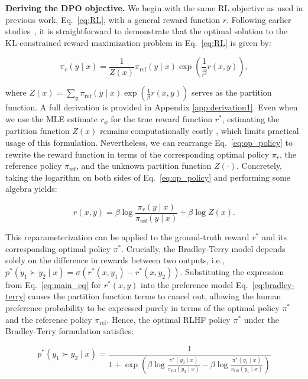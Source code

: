 \textbf{Deriving the DPO objective.} We begin with the same RL objective as used in previous work, Eq.~\ref{eq:RL}, with a general reward function $r$. Following earlier studies~\citep{peters2007reinforcement, peng2019advantage, korbak2022reinforcement, go2023aligning}, it is straightforward to demonstrate that the optimal solution to the KL-constrained reward maximization problem in Eq.~\ref{eq:RL} is given by:

\begin{equation}\label{eq:op_policy}
    \pi_r(y\mid x) = \frac{1}{Z(x)}\pi_\text{ref}(y\mid x)\exp\left(\frac{1}{\beta}r(x, y)\right),
\end{equation}

where $Z(x) = \sum_{y}\pi_\text{ref}(y\mid x)\exp\left(\frac{1}{\beta}r(x, y)\right)$ serves as the partition function. A full derivation is provided in Appendix \ref{app:derivation1}. Even when we use the MLE estimate $r_{\phi}$ for the true reward function $r^*$, estimating the partition function $Z(x)$ remains computationally costly \citep{korbak2022reinforcement, go2023aligning}, which limits practical usage of this formulation. Nevertheless, we can rearrange Eq.~\ref{eq:op_policy} to rewrite the reward function in terms of the corresponding optimal policy $\pi_r$, the reference policy $\pi_\text{ref}$, and the unknown partition function $Z(\cdot)$. Concretely, taking the logarithm on both sides of Eq.~\ref{eq:op_policy} and performing some algebra yields:

\begin{equation}\label{eq:main_eq}
    r(x,y) = \beta \log \frac{\pi_r(y\mid x)}{\pi_\text{ref}(y\mid x)} + \beta \log Z(x).
\end{equation}

This reparameterization can be applied to the ground-truth reward $r^*$ and its corresponding optimal policy $\pi^*$. Crucially, the Bradley-Terry model depends solely on the difference in rewards between two outputs, i.e., ${p^*(y_1 \succ y_2 \mid x) = \sigma(r^*(x, y_1) - r^*(x, y_2))}$. Substituting the expression from Eq.~\ref{eq:main_eq} for $r^*(x,y)$ into the preference model Eq.~\ref{eq:bradley-terry} causes the partition function terms to cancel out, allowing the human preference probability to be expressed purely in terms of the optimal policy $\pi^*$ and the reference policy $\pi_\text{ref}$. Hence, the optimal RLHF policy $\pi^*$ under the Bradley-Terry formulation satisfies:

\begin{equation}\label{eq:objective}
    p^*(y_1\succ y_2 \mid x)=\frac{1}{1 + \exp\left(\beta \log \frac{\pi^*(y_2\mid x)}{\pi_\text{ref}(y_2\mid x)} - \beta \log \frac{\pi^*(y_1\mid x)}{\pi_\text{ref}(y_1\mid x)}\right)}
\end{equation}

